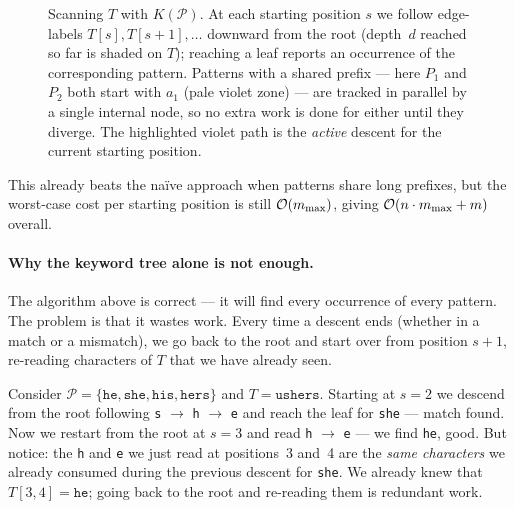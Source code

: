 \begin{figure}[H]
\caption{%
  Scanning $T$ with $K(\mathcal{P})$.
  At each starting position $s$ we follow edge-labels
  $T[s], T[s{+}1],\ldots$ downward from the root (depth~$d$ reached so
  far is shaded on $T$); reaching a leaf reports an occurrence of the
  corresponding pattern.
  Patterns with a shared prefix --- here $P_1$ and $P_2$ both start with
  $a_1$ (pale violet zone) --- are tracked in parallel by a single internal
  node, so no extra work is done for either until they diverge.
  The highlighted violet path is the \emph{active} descent for the current
  starting position.
}
\label{fig:ktree-scan}
\end{figure}

This already beats the naïve approach when patterns share long prefixes, but
the worst-case cost per starting position is still $\mathcal{O}\!\left(m_{\max}\right)$, giving
$\mathcal{O}\!\left(n \cdot m_{\max} + m\right)$ overall.

\paragraph{Why the keyword tree alone is not enough.}
The algorithm above is correct --- it will find every occurrence of every
pattern.
The problem is that it wastes work.
Every time a descent ends (whether in a match or a mismatch), we go back
to the root and start over from position $s{+}1$, re-reading characters
of $T$ that we have already seen.

Consider
$\mathcal{P} = \{\texttt{he},\texttt{she},\texttt{his},\texttt{hers}\}$
and $T = \texttt{ushers}$.
Starting at $s = 2$ we descend from the root following
\texttt{s} $\to$ \texttt{h} $\to$ \texttt{e} and reach the leaf for
\texttt{she} --- match found.
Now we restart from the root at $s = 3$ and read \texttt{h} $\to$
\texttt{e} --- we find \texttt{he}, good.
But notice: the \texttt{h} and \texttt{e} we just read at positions~3
and~4 are the \emph{same characters} we already consumed during the
previous descent for \texttt{she}.
We already knew that $T[3{,}4] = \texttt{he}$; going back to the root
and re-reading them is redundant work.

